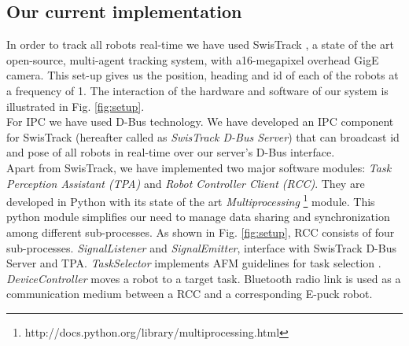 \documentclass[letterpaper, 10 pt, conference]{ieeeconf}  %
\begin{document}
\subsection{Our current implementation}
In order to track all robots real-time we have used SwisTrack \cite{SwisTrack}, a state of the art open-source, multi-agent tracking system, with a16-megapixel overhead GigE camera. This set-up gives us the position, heading and id of each of the robots at a frequency of 1. The interaction of the hardware and software of our system is illustrated in Fig. \ref{fig:setup}. \\
For IPC we have used D-Bus technology. %
We have developed an IPC component for SwisTrack (hereafter called as \textit{SwisTrack D-Bus Server}) that can broadcast id and pose of all robots in real-time over our server's D-Bus interface.\\
Apart from SwisTrack, we have implemented two major software modules: {\em Task Perception Assistant (TPA)} and {\em Robot Controller Client (RCC)}. They are developed in Python with its state of the art \textit{Multiprocessing} \footnote{http://docs.python.org/library/multiprocessing.html} module. This python module simplifies our need to manage data sharing and synchronization among different sub-processes. As shown in Fig. \ref{fig:setup}, RCC consists of four sub-processes. {\em SignalListener} and {\em SignalEmitter}, interface with SwisTrack D-Bus Server and TPA. {\em TaskSelector} implements AFM guidelines for task selection . {\em DeviceController} moves a robot to a target task. Bluetooth radio link is used as a communication medium between a RCC and a corresponding E-puck robot. 
%
\end{document}
